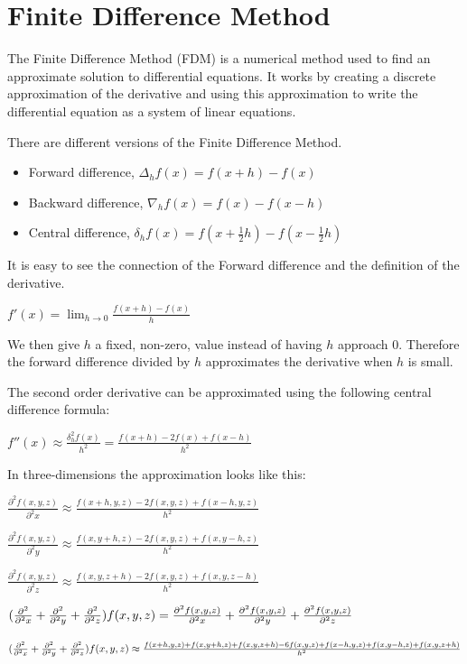 \section*{Finite Difference Method}

The Finite Difference Method (FDM) is a numerical method used to find an approximate 
solution to differential equations. It works by creating a discrete approximation 
of the derivative and using this approximation to write the differential equation 
as a system of linear equations.

There are different versions of the Finite Difference Method.
\begin{itemize}
	\item Forward difference, $\Delta_hf(x) = f(x+h) - f(x)$
	\item Backward difference, $\nabla_hf(x) = f(x) - f(x - h)$
	\item Central difference, $\delta_hf(x) = f(x + \frac{1}{2}h) - f(x - \frac{1}{2}h)$
\end{itemize}

It is easy to see the connection of the Forward difference and the definition of 
the derivative.

$f'(x) = \lim_{h \to 0} \frac{f(x+h) - f(x)}{h}$

We then give $h$ a fixed, non-zero, value instead of having $h$ approach 0. Therefore 
the forward difference divided by $h$ approximates the derivative when $h$ is small.

The second order derivative can be approximated using the following central difference formula:

$f''(x) \approx \frac{\delta_h^2f(x)}{h^2} = \frac{f(x+h) - 2f(x) + f(x-h)}{h^2}$

In three-dimensions the approximation looks like this:

$\frac{\partial^2 f(x, y, z)}{\partial^2 x} \approx \frac{f(x+h, y, z) - 2f(x, y, z) + f(x-h, y, z)}{h^2}$

$\frac{\partial^2 f(x, y, z)}{\partial^2 y} \approx \frac{f(x, y+h, z) - 2f(x, y, z) + f(x, y-h, z)}{h^2}$

$\frac{\partial^2 f(x, y, z)}{\partial^2 z} \approx \frac{f(x, y, z+h) - 2f(x, y, z) + f(x, y, z-h)}{h^2}$

$(\frac{\partial^2}{\partial^2 x} + \frac{\partial^2}{\partial^2 y} + \frac{\partial^2}{\partial^2 z}) f (x, y, z) = \frac{\partial^2 f(x, y, z)}{\partial^2 x} 
+ \frac{\partial^2 f(x, y, z)}{\partial^2 y} + \frac{\partial^2 f(x, y, z)}{\partial^2 z}$

$(\frac{\partial^2}{\partial^2 x} + \frac{\partial^2}{\partial^2 y} + \frac{\partial^2}{\partial^2 z}) f (x, y, z) \approx \frac{f(x+h, y, z) + f(x, y+h, z) + f(x, y, z+h) 
- 6f(x, y, z) + f(x-h, y, z) + f(x, y-h, z) + f(x, y, z+h)}{h^2}$

